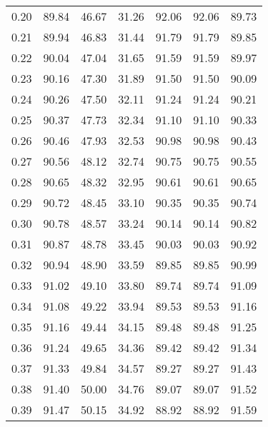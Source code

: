 \begin{tabular}{|c|c|c|c|c|c|c|}
      0.20 &     89.84 &     46.67 &      31.26 &   92.06 &      92.06 &         89.73 \\
      0.21 &     89.94 &     46.83 &      31.44 &   91.79 &      91.79 &         89.85 \\
      0.22 &     90.04 &     47.04 &      31.65 &   91.59 &      91.59 &         89.97 \\
      0.23 &     90.16 &     47.30 &      31.89 &   91.50 &      91.50 &         90.09 \\
      0.24 &     90.26 &     47.50 &      32.11 &   91.24 &      91.24 &         90.21 \\
      0.25 &     90.37 &     47.73 &      32.34 &   91.10 &      91.10 &         90.33 \\
      0.26 &     90.46 &     47.93 &      32.53 &   90.98 &      90.98 &         90.43 \\
      0.27 &     90.56 &     48.12 &      32.74 &   90.75 &      90.75 &         90.55 \\
      0.28 &     90.65 &     48.32 &      32.95 &   90.61 &      90.61 &         90.65 \\
      0.29 &     90.72 &     48.45 &      33.10 &   90.35 &      90.35 &         90.74 \\
      0.30 &     90.78 &     48.57 &      33.24 &   90.14 &      90.14 &         90.82 \\
      0.31 &     90.87 &     48.78 &      33.45 &   90.03 &      90.03 &         90.92 \\
      0.32 &     90.94 &     48.90 &      33.59 &   89.85 &      89.85 &         90.99 \\
      0.33 &     91.02 &     49.10 &      33.80 &   89.74 &      89.74 &         91.09 \\
      0.34 &     91.08 &     49.22 &      33.94 &   89.53 &      89.53 &         91.16 \\
      0.35 &     91.16 &     49.44 &      34.15 &   89.48 &      89.48 &         91.25 \\
      0.36 &     91.24 &     49.65 &      34.36 &   89.42 &      89.42 &         91.34 \\
      0.37 &     91.33 &     49.84 &      34.57 &   89.27 &      89.27 &         91.43 \\
      0.38 &     91.40 &     50.00 &      34.76 &   89.07 &      89.07 &         91.52 \\
      0.39 &     91.47 &     50.15 &      34.92 &   88.92 &      88.92 &         91.59 \\

\end{tabular}
